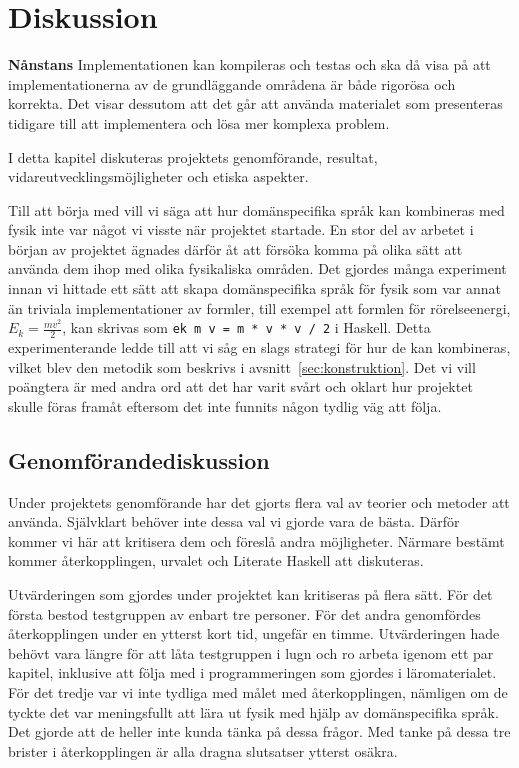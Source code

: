 
\chapter{Diskussion}\label{cha:disk}
\textbf{Nånstans}
Implementationen kan kompileras och testas och ska då visa på att
implementationerna av de grundläggande områdena är både rigorösa och korrekta.
Det visar dessutom att det går att använda materialet som presenteras tidigare
till att implementera och lösa mer komplexa problem.

I detta kapitel diskuteras projektets genomförande, resultat,
vidareutvecklingsmöjligheter och etiska aspekter.

Till att börja med vill vi säga att hur domänspecifika språk kan kombineras med
fysik inte var något vi visste när projektet startade. En stor del av arbetet i
början av projektet ägnades därför åt att försöka komma på olika sätt att
använda dem ihop med olika fysikaliska områden. Det gjordes många experiment
innan vi hittade ett sätt att skapa domänspecifika språk för fysik som var annat än
triviala implementationer av formler, till exempel att formlen för
rörelseenergi, $E_k = \frac{mv^2}{2}$, kan skrivas som \texttt{ek m v = m * v *
v / 2} i Haskell. Detta experimenterande ledde till att
vi såg en slags strategi för hur de kan kombineras, vilket blev den
metodik som beskrivs i avsnitt~\ref{sec:konstruktion}. Det vi vill poängtera är
med andra ord att det har varit svårt och oklart hur projektet skulle föras
framåt eftersom det inte funnits någon tydlig väg att följa.

\section{Genomförandediskussion}

Under projektets genomförande har det gjorts flera val av teorier och metoder att använda. Självklart behöver inte dessa val vi gjorde vara de bästa. Därför kommer vi här att kritisera dem och föreslå andra möjligheter. Närmare bestämt kommer återkopplingen, urvalet och Literate Haskell att diskuteras.

Utvärderingen som gjordes under projektet kan kritiseras på flera sätt. För det första bestod testgruppen av enbart tre personer. För det andra genomfördes återkopplingen under en ytterst kort tid, ungefär en timme. Utvärderingen hade behövt vara längre för att låta testgruppen i lugn och ro arbeta igenom ett par kapitel, inklusive att följa med i programmeringen som gjordes i läromaterialet. För det tredje var vi inte tydliga med målet med återkopplingen, nämligen om de tyckte det var meningsfullt att lära ut fysik med hjälp av domänspecifika språk. Det gjorde att de heller inte kunda tänka på dessa frågor. Med tanke på dessa tre brister i återkopplingen är alla dragna slutsatser ytterst osäkra.

